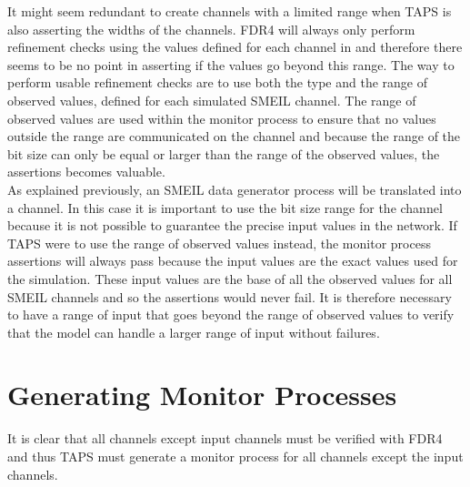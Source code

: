 It might seem redundant to create \cspm{} channels with a limited range when TAPS is also asserting the widths of the channels. FDR4 will always only perform refinement checks using the values defined for each channel in \cspm{} and therefore there seems to be no point in asserting if the values go beyond this range. The way to perform usable refinement checks are to use both the type and the range of observed values, defined for each simulated SMEIL channel. The range of observed values are used within the monitor process to ensure that no values outside the range are communicated on the channel and because the range of the bit size can only be equal or larger than the range of the observed values, the assertions becomes valuable. \\

As explained previously, an SMEIL data generator process will be translated into a \cspm{} channel. In this case it is important to use the bit size range for the \cspm{} channel because it is not possible to guarantee the precise input values in the network. If TAPS were to use the range of observed values instead, the monitor process assertions will always pass because the input values are the exact values used for the simulation. These input values are the base of all the observed values for all SMEIL channels and so the assertions would never fail. It is therefore necessary to have a range of input that goes beyond the range of observed values to verify that the model can handle a larger range of input without failures.
\section{Generating Monitor Processes}

It is clear that all channels except input channels must be verified with FDR4 and thus TAPS must generate a monitor process for all channels except the input channels.


